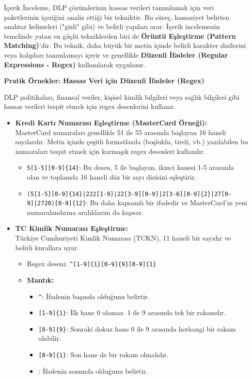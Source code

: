 İçerik İnceleme, DLP çözümlerinin hassas verileri tanımlamak için veri paketlerinin içeriğini analiz ettiği bir tekniktir. Bu süreç, hassasiyet belirten anahtar kelimeleri ("gizli" gibi) ve belirli yapıları arar. İçerik incelemenin temelinde yatan en güçlü tekniklerden biri de \textbf{Örüntü Eşleştirme (Pattern Matching)}'dir. Bu teknik, daha büyük bir metin içinde belirli karakter dizilerini veya kalıpları tanımlamayı içerir ve genellikle \textbf{Düzenli İfadeler (Regular Expressions - Regex)} kullanılarak uygulanır.

\textbf{Pratik Örnekler: Hassas Veri için Düzenli İfadeler (Regex)}

DLP politikaları, finansal veriler, kişisel kimlik bilgileri veya sağlık bilgileri gibi hassas verileri tespit etmek için regex desenlerini kullanır.

\begin{itemize}
    \item \textbf{Kredi Kartı Numarası Eşleştirme (MasterCard Örneği):} \\
    MasterCard numaraları genellikle 51 ile 55 arasında başlayan 16 haneli sayılardır. Metin içinde çeşitli formatlarda (boşluklu, tireli, vb.) yazılabilen bu numaraları tespit etmek için karmaşık regex desenleri kullanılır.
    \begin{itemize}
        \item \texttt{5[1-5][0-9]\{14\}}: Bu desen, 5 ile başlayan, ikinci hanesi 1-5 arasında olan ve toplamda 16 haneli düz bir sayı dizisini eşleştirir.
        \item \texttt{(5[1-5][0-9]\{14\}|222[1-9]|22[3-9][0-9]|2[3-6][0-9]\{2\}|27[0-9]|2720)[0-9]\{12\}}: Bu daha kapsamlı bir ifadedir ve MasterCard'ın yeni numaralandırma aralıklarını da kapsar.
    \end{itemize}

    \item \textbf{TC Kimlik Numarası Eşleştirme:} \\
    Türkiye Cumhuriyeti Kimlik Numarası (TCKN), 11 haneli bir sayıdır ve belirli kurallara uyar.
    \begin{itemize}
        \item Regex deseni: \texttt{\textasciicircum[1-9]\{1\}[0-9]\{9\}[0-9]\{1\}\textdollar}
        \item \textbf{Mantık:}
        \begin{itemize}
            \item \texttt{\textasciicircum}: İfadenin başında olduğunu belirtir.
            \item \texttt{[1-9]\{1\}}: İlk hane 0 olamaz. 1 ile 9 arasında tek bir rakamdır.
            \item \texttt{[0-9]\{9\}}: Sonraki dokuz hane 0 ile 9 arasında herhangi bir rakam olabilir.
            \item \texttt{[0-9]\{1\}}: Son hane de bir rakam olmalıdır.
            \item \texttt{\textdollar}: İfadenin sonunda olduğunu belirtir.
        \end{itemize}
    \end{itemize}
\end{itemize}



